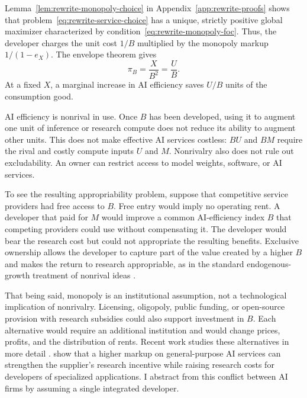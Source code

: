 Lemma~\ref{lem:rewrite-monopoly-choice} in
Appendix~\ref{app:rewrite-proofs} shows that
problem~\eqref{eq:rewrite-service-choice} has a unique, strictly positive
global maximizer characterized by condition~\eqref{eq:rewrite-monopoly-foc}.
Thus, the developer charges the unit cost $1/B$ multiplied by the monopoly
markup $1/(1-e_X)$.
The envelope theorem gives
\begin{equation}
 \pi_B=\frac{X}{B^2}=\frac{U}{B}.
 \label{eq:rewrite-profit-envelope}
\end{equation}
At a fixed $X$, a marginal increase in AI efficiency saves $U/B$ units of the consumption good.

AI efficiency is nonrival in use. Once $B$ has been developed, using it to
augment one unit of inference or research compute does not reduce its ability to augment other units. This does not make effective AI services costless: $BU$ and $BM$ require the rival and costly compute inputs $U$ and $M$. Nonrivalry also does not rule out excludability. An owner can restrict access to model weights, software, or AI services.

To see the resulting appropriability problem, suppose that competitive
service providers had free access to $B$. Free entry would imply no operating rent. A developer that paid for $M$ would improve a common AI-efficiency index $B$ that competing providers could use without compensating it. The developer would bear the research cost but could not appropriate the resulting benefits. %
Exclusive ownership allows the developer to capture part of the value created by a higher $B$ and makes the return to research appropriable, as in the standard endogenous-growth treatment of nonrival ideas \citep{romer1990}.

That being said, monopoly is an institutional assumption, not a technological implication of nonrivalry. Licensing, oligopoly, public funding, or open-source provision with research subsidies could also support investment in $B$. Each alternative would require an additional institution and would change prices, profits, and the distribution of rents. Recent work studies these alternatives in more detail \citep{korinekvipra2025,gans2024,demireretal2025}.
\citet{liuwan2026} show that a higher markup on general-purpose AI
services can strengthen the supplier's research incentive while raising
research costs for developers of specialized applications. I abstract
from this conflict between AI firms by assuming a single integrated
developer.

